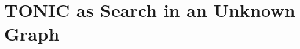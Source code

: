 \documentclass[journal]{IEEEtran}
\begin{document}






\section{TONIC as Search in an Unknown Graph} 
\label{sec:TONICAsHeuristic}
\end{document}
